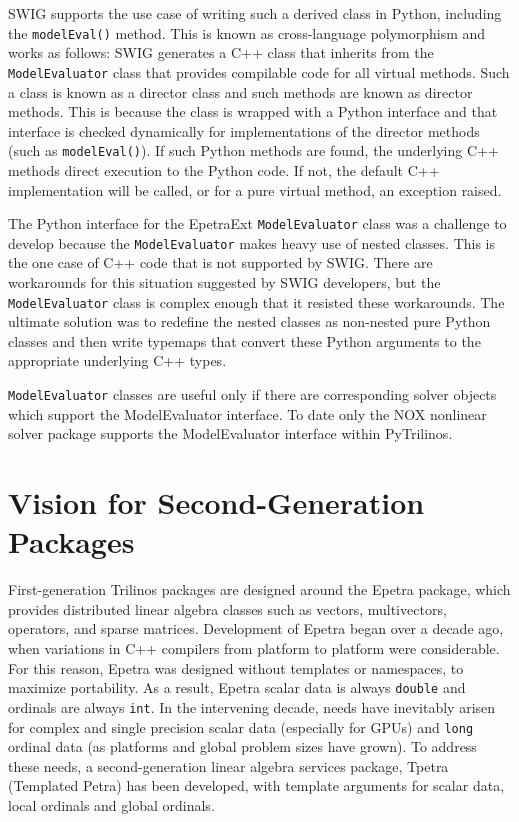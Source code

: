 \documentclass[11pt]{article}
\begin{document}
SWIG supports the use case of writing such a derived class in Python, including the {\tt modelEval()} method.  This is known as cross-language polymorphism and works as follows:  SWIG generates a C++ class that inherits from the {\tt ModelEvaluator} class that provides compilable code for all virtual methods.  Such a class is known as a director class and such methods are known as director methods.  This is because the class is wrapped with a Python interface and that interface is checked dynamically for implementations of the director methods (such as {\tt modelEval()}).  If such Python methods are found, the underlying C++ methods direct execution to the Python code.  If not, the default C++ implementation will be called, or for a pure virtual method, an exception raised.

The Python interface for the EpetraExt {\tt ModelEvaluator} class was a challenge to develop because the {\tt ModelEvaluator} makes heavy use of nested classes.  This is the one case of C++ code that is not supported by SWIG.  There are workarounds for this situation suggested by SWIG developers, but the {\tt ModelEvaluator} class is complex enough that it resisted these workarounds.  The ultimate solution was to redefine the nested classes as non-nested pure Python classes and then write typemaps that convert these Python arguments to the appropriate underlying C++ types.

{\tt ModelEvaluator} classes are useful only if there are corresponding solver objects which support the ModelEvaluator interface.  To date only the NOX nonlinear solver package supports the ModelEvaluator interface within PyTrilinos.

\section{Vision for Second-Generation Packages}
\label{sec:vision}

First-generation Trilinos packages are designed around the Epetra package, which provides distributed linear algebra classes such as vectors, multivectors, operators, and sparse matrices.  Development of Epetra began over a decade ago, when variations in C++ compilers from platform to platform were considerable.  For this reason, Epetra was designed without templates or namespaces, to maximize portability.  As a result, Epetra scalar data is always {\tt double} and ordinals are always {\tt int}.  In the intervening decade, needs have inevitably arisen for complex and single precision scalar data (especially for GPUs) and {\tt long} ordinal data (as platforms and global problem sizes have grown).  To address these needs, a second-generation linear algebra services package, Tpetra (Templated Petra) has been developed, with template arguments for scalar data, local ordinals and global ordinals.
\end{document}
